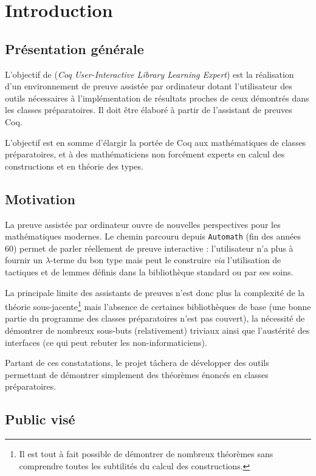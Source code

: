 \section{Introduction}

\subsection{Présentation générale}

L'objectif de \coquille{} (\emph{Coq User-Interactive Library Learning Expert}) est la réalisation d'un environnement de preuve assistée par ordinateur dotant l'utilisateur des outils nécessaires à l'implémentation de résultats proches de ceux démontrés dans les classes préparatoires. Il doit être élaboré à partir de l'assistant de preuves Coq.

L'objectif est en somme d'élargir la portée de Coq aux mathématiques de classes préparatoires, et à des mathématiciens non forcément experts en calcul des constructions et en théorie des types.

\subsection{Motivation}

La preuve assistée par ordinateur ouvre de nouvelles perspectives pour les mathématiques modernes. Le chemin parcouru depuis \texttt{Automath}\cite{automath} (fin des années 60) permet de parler réellement de preuve interactive : l'utilisateur n'a plus à fournir un $\lambda$-terme du bon type mais peut le construire \emph{via} l'utilisation de tactiques et de lemmes définis dans la bibliothèque standard ou par ses soins.

La principale limite des assistants de preuves n'est donc plus la complexité de la théorie sous-jacente\footnote{Il est tout à fait possible de démontrer de nombreux théorèmes sans comprendre toutes les subtilités du calcul des constructions.} mais l'absence de certaines bibliothèques de base (une bonne partie du programme des classes préparatoires n'est pas couvert), la nécessité de démontrer de nombreux sous-buts (relativement) triviaux ainsi que l'austérité des interfaces (ce qui peut rebuter les non-informaticiens).

Partant de ces constatations, le projet \coquille{} tâchera de développer des outils permettant de démontrer simplement des théorèmes énoncés en classes préparatoires.

\subsection{Public visé}

